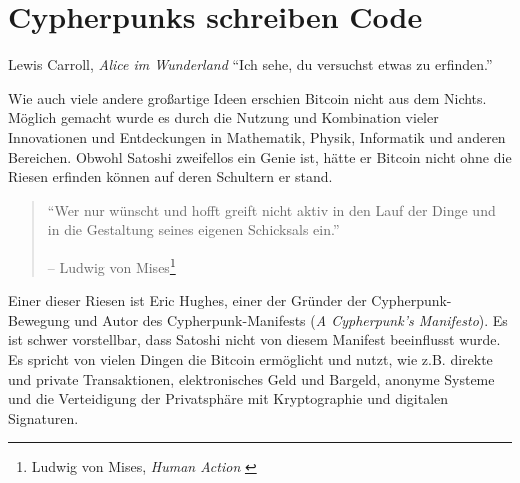 \chapter{Cypherpunks schreiben Code}
\label{les:20}

\begin{chapquote}{Lewis Carroll, \textit{Alice im Wunderland}}
\enquote{Ich sehe, du versuchst etwas zu erfinden.}
\end{chapquote}

Wie auch viele andere großartige Ideen erschien Bitcoin nicht aus dem Nichts.
Möglich gemacht wurde es durch die Nutzung und Kombination vieler Innovationen
und Entdeckungen in Mathematik, Physik, Informatik und anderen Bereichen. Obwohl
Satoshi zweifellos ein Genie ist, hätte er Bitcoin nicht ohne die Riesen
erfinden können auf deren Schultern er stand.

\begin{quotation}\begin{samepage}
\enquote{Wer nur wünscht und hofft greift nicht aktiv in den Lauf der Dinge und
in die Gestaltung seines eigenen Schicksals ein.}
\begin{flushright} -- Ludwig von Mises\footnote{Ludwig von Mises, \textit{Human
Action} \cite{human-action}}
\end{flushright}\end{samepage}\end{quotation}

Einer dieser Riesen ist Eric Hughes, einer der Gründer der Cypherpunk-Bewegung
und Autor des Cypherpunk-Manifests (\textit{A Cypherpunk's Manifesto}). Es ist
schwer vorstellbar, dass Satoshi nicht von diesem Manifest beeinflusst wurde. Es
spricht von vielen Dingen die Bitcoin ermöglicht und nutzt, wie z.B. direkte und
private Transaktionen, elektronisches Geld und Bargeld, anonyme Systeme und die
Verteidigung der Privatsphäre mit Kryptographie und digitalen Signaturen.

\begin{quotation}\end{quotation}

